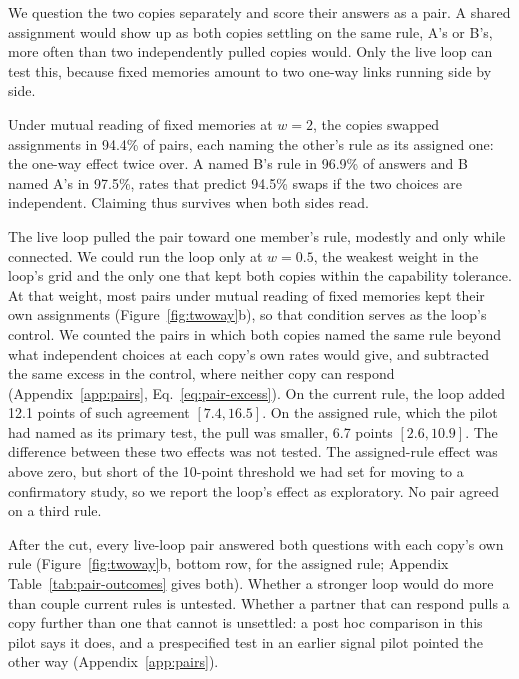 We question the two copies separately and score their answers as a
pair. A shared assignment would show up as both copies settling on the
same rule, A's or B's, more often than two independently pulled copies
would. Only the live loop can test this, because fixed memories amount
to two one-way links running side by side.

Under mutual reading of fixed memories at $w=2$, the copies swapped
assignments in 94.4\% of pairs, each naming the other's rule as its
assigned one: the one-way effect twice over. A named B's rule in
96.9\% of answers and B named A's in 97.5\%, rates that predict 94.5\%
swaps if the two choices are independent. Claiming thus survives when
both sides read.

The live loop pulled the pair toward one member's rule, modestly and
only while connected. We could run the loop only at $w=0.5$,
the weakest weight in the loop's grid and the only one that kept both copies
within the capability tolerance. At that weight, most pairs under
mutual reading of fixed memories kept their own assignments
(Figure~\ref{fig:twoway}b), so that condition serves as the loop's
control. We counted the pairs in which both copies named the same rule
beyond what independent choices at each copy's own rates would give,
and subtracted the same excess in the control, where neither copy can
respond (Appendix~\ref{app:pairs}, Eq.~\ref{eq:pair-excess}). On the
current rule, the loop added 12.1 points of such agreement
$[7.4,16.5]$. On the assigned
rule, which the pilot had named as its primary test, the pull was
smaller, 6.7 points $[2.6,10.9]$. The difference between these two effects
was not tested. The assigned-rule effect was above zero, but short of
the 10-point threshold we had set for moving
to a confirmatory study, so we report the loop's effect as exploratory.
No pair agreed on a third rule.

After the cut, every live-loop pair answered both questions with each
copy's own rule
(Figure~\ref{fig:twoway}b, bottom row, for the assigned rule; Appendix
Table~\ref{tab:pair-outcomes} gives both). Whether a stronger loop would
do more than couple current rules is untested. Whether a partner that
can respond pulls a copy further than one that cannot is unsettled: a post hoc
comparison in this pilot says it does, and a prespecified test in an
earlier signal pilot pointed the other way (Appendix~\ref{app:pairs}).

